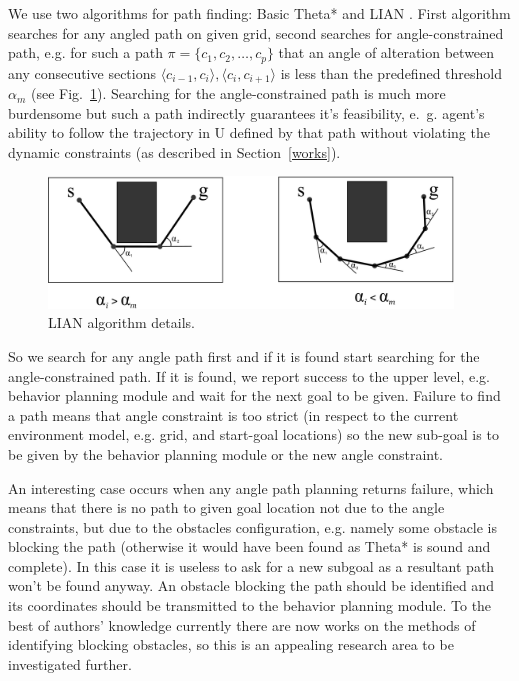 \documentclass[runningheads,a4paper]{llncs}
\begin{document}
We use two algorithms for path finding: Basic Theta* \cite{Nash2007} and LIAN \cite{Yakovlev2015}. First algorithm searches for any angled path on given grid, second  searches for angle-constrained path, e.g. for such a path $\pi=\{c_1, c_2, \dots, c_p\}$ that an angle of alteration between any consecutive sections $\langle c_{i-1}, c_i\rangle, \langle c_i, c_{i+1}\rangle$ is less than the predefined threshold $\alpha_m$ (see Fig.~\ref{fig:lian}). Searching for the angle-constrained path is much more burdensome but such a path indirectly guarantees it's feasibility, e.~g. agent's ability to follow the trajectory in U defined by that path without violating the dynamic constraints (as described in Section~\ref{works}). 

\begin{figure}
	\centering
	\includegraphics[height=3.5cm]{path_lian}
	\caption{LIAN algorithm details.}
	\label{fig:lian}
\end{figure}

So we search for any angle path first and if it is found start searching for the angle-constrained path. If it is found, we report success to the upper level, e.g. behavior planning module and wait for the next goal to be given. Failure to find a path means that angle constraint is too strict (in respect to the current environment model, e.g. grid, and start-goal locations) so the new sub-goal is to be given by the behavior planning module or the new angle constraint.

An interesting case occurs when any angle path planning returns failure, which means that there is no path to given goal location not due to the angle constraints, but due to the obstacles configuration, e.g. namely some obstacle is blocking the path (otherwise it would have been found as Theta* is sound and complete). In this case it is useless to ask for a new subgoal as a resultant path won't be found anyway. An obstacle blocking the path should be identified and its coordinates should be transmitted to the behavior planning module. To the best of authors' knowledge currently there are now works on the methods of identifying blocking obstacles, so this is an appealing research area to be investigated further.
\end{document}

